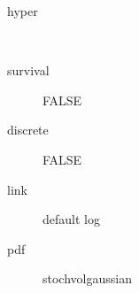 \begin{description}
	\item[hyper]\ 
	\item[survival] FALSE
	\item[discrete] FALSE
	\item[link] default log
	\item[pdf] stochvolgaussian
\end{description}
